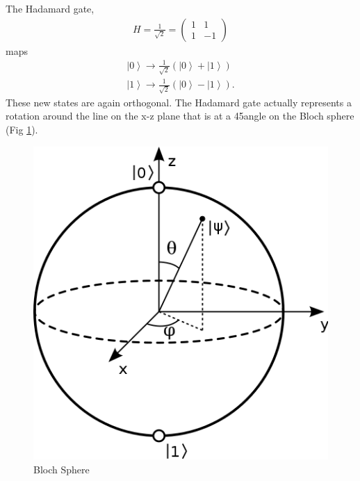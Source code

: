 \documentclass[11pt]{article} %
\newcommand{\ket}[1]{\left|#1\right\rangle}
\begin{document}
The Hadamard gate,
\begin{align}
    H=\frac{1}{\sqrt{2}} =
    \begin{pmatrix}
        1 & 1\\
        1 & -1
    \end{pmatrix}
\end{align}
maps
\begin{align}
    \ket{0} \rightarrow \frac{1}{\sqrt{2}}\left(\ket{0}+\ket{1}\right)\nonumber\\
    \ket{1} \rightarrow \frac{1}{\sqrt{2}}\left(\ket{0}-\ket{1}\right).\nonumber
\end{align}
These new states are again orthogonal. The Hadamard gate actually represents a rotation around the line on the x-z plane that is at a 45\degree angle on the Bloch sphere (Fig \ref{fig:bloch}).
\begin{figure}
    \centering
  \includegraphics[scale=0.35]{Lecture3Figs/BlochSphere_diag.png}
  \caption{Bloch Sphere}
  \label{fig:bloch}
\end{figure}
\end{document}
